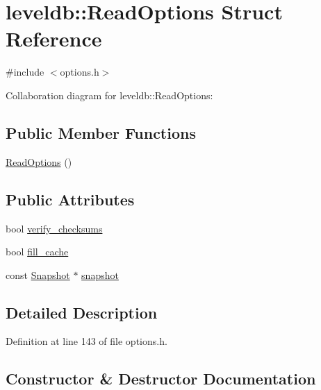 \hypertarget{structleveldb_1_1_read_options}{}\section{leveldb\+:\+:Read\+Options Struct Reference}
\label{structleveldb_1_1_read_options}


{\ttfamily \#include $<$options.\+h$>$}



Collaboration diagram for leveldb\+:\+:Read\+Options\+:
\subsection*{Public Member Functions}
\begin{DoxyCompactItemize}
\item 
\hyperlink{structleveldb_1_1_read_options_a6bf119f5a33b0d0a70fb60d8114351ef}{Read\+Options} ()
\end{DoxyCompactItemize}
\subsection*{Public Attributes}
\begin{DoxyCompactItemize}
\item 
bool \hyperlink{structleveldb_1_1_read_options_a43731d67b707995e20571ad33c1f53f2}{verify\+\_\+checksums}
\item 
bool \hyperlink{structleveldb_1_1_read_options_a49f3754f8838596148ed5cbf9bbf8664}{fill\+\_\+cache}
\item 
const \hyperlink{classleveldb_1_1_snapshot}{Snapshot} $\ast$ \hyperlink{structleveldb_1_1_read_options_a1fa3fffc267dff89fce7c39d7c7b5b50}{snapshot}
\end{DoxyCompactItemize}


\subsection{Detailed Description}


Definition at line 143 of file options.\+h.



\subsection{Constructor \& Destructor Documentation}
\hypertarget{structleveldb_1_1_read_options_a6bf119f5a33b0d0a70fb60d8114351ef}{}
